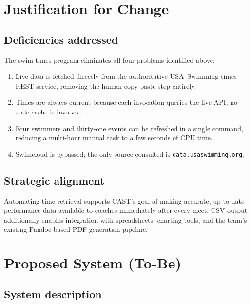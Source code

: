 \documentclass[12pt]{article}
\begin{document}
\section{Justification for Change}

\subsection{Deficiencies addressed}

The swim-times program eliminates all four problems identified above:

\begin{enumerate}
  \item Live data is fetched directly from the authoritative
        USA~Swimming times REST service, removing the human
        copy-paste step entirely.
  \item Times are always current because each invocation queries
        the live API; no stale cache is involved.
  \item Four swimmers and thirty-one events can be refreshed in a
        single command, reducing a multi-hour manual task to a few
        seconds of CPU time.
  \item Swimcloud is bypassed; the only source consulted is
        \texttt{data.usaswimming.org}.
\end{enumerate}

\subsection{Strategic alignment}

Automating time retrieval supports CAST's goal of making accurate,
up-to-date performance data available to coaches immediately after
every meet.  CSV output additionally enables integration with
spreadsheets, charting tools, and the team's existing Pandoc-based
PDF generation pipeline.

\section{Proposed System (To-Be)}

\subsection{System description}
\end{document}

